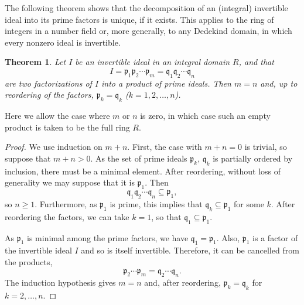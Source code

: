 \documentclass[12pt]{article}
\newtheorem*{theorem*}{Theorem}
\begin{document}
The following theorem shows that the decomposition of an (integral) invertible ideal into its prime factors is unique, if it exists. This applies to the ring of integers in a number field or, more generally, to any Dedekind domain, in which every nonzero ideal is invertible.

\begin{theorem*}
Let $I$ be an invertible ideal in an integral domain $R$, and that
\begin{equation*}
I=\mathfrak{p}_1\mathfrak{p}_2\cdots\mathfrak{p}_m=\mathfrak{q}_1\mathfrak{q}_2\cdots\mathfrak{q}_n
\end{equation*}
are two factorizations of $I$ into a product of prime ideals. Then $m=n$ and, up to reordering of the factors, $\mathfrak{p}_k=\mathfrak{q}_k$ ($k=1,2,\ldots,n$).
\end{theorem*}

Here we allow the case where $m$ or $n$ is zero, in which case such an empty product is taken to be the full ring $R$.

\begin{proof}
We use induction on $m+n$. First, the case with $m+n=0$ is trivial, so suppose that $m+n>0$.
As the set of prime ideals $\mathfrak{p}_k$, $\mathfrak{q}_k$ is partially ordered by inclusion, there must be a minimal element. After reordering, without loss of generality we may suppose that it is $\mathfrak{p}_1$. Then
\begin{equation*}
\mathfrak{q}_1\mathfrak{q}_2\cdots\mathfrak{q}_n\subseteq\mathfrak{p}_1,
\end{equation*}
so $n\ge 1$. Furthermore, as $\mathfrak{p}_1$ is prime, this implies that $\mathfrak{q}_k\subseteq\mathfrak{p}_1$ for some $k$. After reordering the factors, we can take $k=1$, so that $\mathfrak{q}_1\subseteq\mathfrak{p}_1$.

As $\mathfrak{p}_1$ is minimal among the prime factors, we have $\mathfrak{q}_1=\mathfrak{p}_1$. Also, $\mathfrak{p}_1$ is a factor of the invertible ideal $I$ and so is itself invertible. Therefore, it can be cancelled from the products,
\begin{equation*}
\mathfrak{p}_2\cdots\mathfrak{p}_m=\mathfrak{q}_2\cdots\mathfrak{q}_n.
\end{equation*}
The induction hypothesis gives $m=n$ and, after reordering, $\mathfrak{p}_k=\mathfrak{q}_k$ for $k=2,\ldots,n$.
\end{proof}

\end{document}
